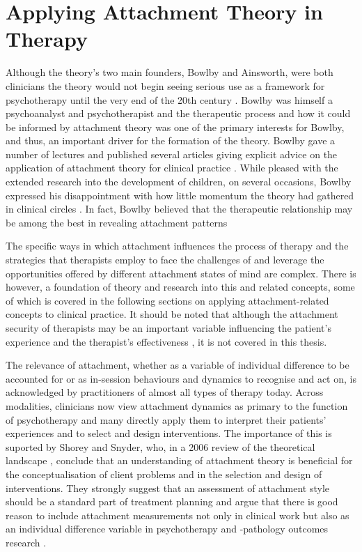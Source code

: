 \documentclass[12pt]{report}
\begin{document}
\section{Applying Attachment Theory in Therapy}
\label{sec:Applying attachment in therapy}
Although the theory's two main founders, Bowlby and Ainsworth, were both clinicians the theory would not begin seeing serious use as a framework for psychotherapy until the very end of the 20th century \cite{Slade2019}.
Bowlby was himself a psychoanalyst and psychotherapist and the therapeutic process and how it could be informed by attachment theory was one of the primary interests for Bowlby, and thus, an important driver for the formation of the theory.
Bowlby gave a number of lectures and published several articles giving explicit advice on the application of attachment theory for clinical practice \cite{Bowlby2005b}.
While pleased with the extended research into the development of children, on several occasions, Bowlby expressed his disappointment with how little momentum the theory had gathered in clinical circles \cite{Bowlby1988}.
In fact, Bowlby believed that the therapeutic relationship may be among the best in revealing attachment patterns \cite{Bowlby1988}

The specific ways in which attachment influences the process of therapy and the strategies that therapists employ to face the challenges of and leverage the opportunities offered by different attachment states of mind are complex.
There is however, a foundation of theory and research into this and related concepts, some of which is covered in the following sections on applying attachment-related concepts to clinical practice.
It should be noted that although the attachment security of therapists may be an important variable influencing the patient's experience and the therapist's effectiveness \cite{Mikulincer2013, Daniel2006, Dozier1994, Cologon2017, Talia2020}, it is not covered in this thesis.

The relevance of attachment, whether as a variable of individual difference to be accounted for or as in-session behaviours and dynamics to recognise and act on, is acknowledged by practitioners of almost all types of therapy today.
Across modalities, clinicians now view attachment dynamics as primary to the function of psychotherapy and many directly apply them to interpret their patients' experiences and to select and design interventions.
The importance of this is suported by Shorey and Snyder, who, in a 2006 review of the theoretical landscape \cite{Shorey2006}, conclude that an understanding of attachment theory is beneficial for the conceptualisation of client problems and in the selection and design of interventions.
They strongly suggest that an assessment of attachment style should be a standard part of treatment planning and argue that there is good reason to include attachment measurements not only in clinical work but also as an individual difference variable in psychotherapy and -pathology outcomes research \cite{Shorey2006}.
\end{document}
